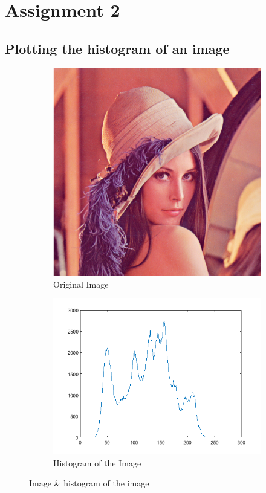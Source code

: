\documentclass[a4paper,16pt]{article}
\begin{document}
	\section{Assignment 2}
	\vspace{0.2in}
	\subsection{Plotting the histogram of an image}
	\vspace{0.2in}
		
		\vspace{1.4in}
		\begin{figure}[h!]
			\begin{subfigure}[h]{0.4\linewidth}
				\includegraphics[scale=0.45,height=0.9\linewidth]{original}
				\caption{Original Image}
			\end{subfigure}
			\hfill
			\begin{subfigure}[h]{0.57\linewidth}
				\includegraphics[width=\linewidth]{histogram}
				\caption{Histogram of the Image}
			\end{subfigure}%
			\caption{Image \& histogram of the image}
		\end{figure}
	\newpage
\end{document}
